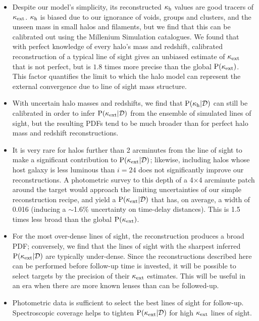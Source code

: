 \documentclass[useAMS,usenatbib,a4paper]{mn2e}
\begin{document}
\begin{itemize} 

\item Despite our model's simplicity, its reconstructed $\kappa_{\rm h}$ values are
good tracers of $\kappa_{\rm ext}$. $\kappa_{\rm h}$ is biased due to our ignorance of voids,
groups and clusters, and the unseen mass in small halos and filaments, but we
find that this can be calibrated out using the Millenium Simulation
catalogues. We found that with perfect knowledge of every halo's mass and
redshift,  calibrated reconstruction of a typical line of sight  gives an
unbiased estimate of $\kappa_{\rm ext}$ that is not perfect, but is $1.8$ 
times more precise than the global
${\rm P}(\kappa_{\rm ext})$. This factor quantifies the limit to which the halo model can
represent the external convergence due to line of sight mass structure.

\item With uncertain halo masses and redshifts, we find that
${\rm P}(\kappa_{\rm h}|{\mathcal{D}})$ can still be calibrated in order to infer
${\rm P}(\kappa_{\rm ext}|{\mathcal{D}})$ from the ensemble of simulated lines of sight, but the
resulting PDFs tend to be much broader than for perfect halo mass and redshift
reconstructions.

\item It is very rare for halos further than 2 arcminutes from the line of
sight to make a significant contribution to ${\rm P}(\kappa_{\rm ext}|{\mathcal{D}})$; likewise, 
including
halos whose host galaxy is less luminous than $i=24$ does not significantly
improve our reconstructions.  A photometric survey to this depth of a
4$\times$4 arcminute patch around the target would approach the limiting
uncertainties of our simple reconstruction recipe, and yield a 
${\rm P}(\kappa_{\rm ext}|{\mathcal{D}})$ that has, on average, a width of 0.016 (inducing a $\sim$1.6\%
uncertainty on time-delay distances). This is 1.5 times
less broad than the global ${\rm P}(\kappa_{\rm ext})$. 

\item  For the most over-dense lines of sight, the reconstruction produces a
broad PDF; conversely, we find that the lines of sight with the sharpest
inferred ${\rm P}(\kappa_{\rm ext}|{\mathcal{D}})$ are typically under-dense. Since the
reconstructions described here can be performed before follow-up time is
invested, it will be possible to select targets by the precision of their
$\kappa_{\rm ext}$ estimates. This will be useful in an era when there are more known
lenses than can be followed-up.

\item  Photometric data is sufficient to select the best lines of sight for
follow-up. Spectroscopic coverage helps to tighten  ${\rm P}(\kappa_{\rm ext}|{\mathcal{D}})$ for
high $\kappa_{\rm ext}$ lines of sight.


\end{itemize}
\end{document}
